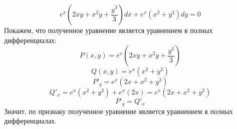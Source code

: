 \documentclass[a5paper, 10pt]{article}
\theoremstyle{definition}
\theoremstyle{plain}
\theoremstyle{remark}
\begin{document}
\begin{equation*}
e^x \left( 2xy + x^2y+\frac{y^3}{3} \right)dx + e^x \left(x^2 + y^2 \right)dy = 0
\end{equation*}
Покажем, что полученное уравнение является уравнением в полных дифференциалах:
\begin{equation*}
P(x, y) = e^x \left( 2xy + x^2y+\frac{y^3}{3} \right)
\end{equation*}
\begin{equation*}
Q(x, y) =  e^x \left(x^2 + y^2 \right)
\end{equation*}
\begin{equation*}
P'_y= e^x \left( 2x + x^2+y^2 \right)
\end{equation*}
\begin{equation*}
Q'_x =  e^x \left(x^2 + y^2 \right) + e^x \left(2x \right)  = e^x \left(2x + x^2 + y^2 \right) 
\end{equation*}
\begin{equation*}
P'_y= Q'_x 
\end{equation*}
Значит, по признаку полученное уравнение является уравнением в полных дифференциалах.
\end{document}
